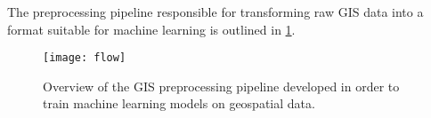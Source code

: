 The preprocessing pipeline responsible for transforming raw GIS data into a format suitable for machine learning is outlined in \cref{fig:preprocessing-overview}.

\begin{figure}[H]
  \centering
  \texttt{[image: flow]}
  \caption{%
    Overview of the GIS preprocessing pipeline developed in order to train machine learning models on geospatial data.
  }%
  \label{fig:preprocessing-overview}
\end{figure}
\raggedbottom
